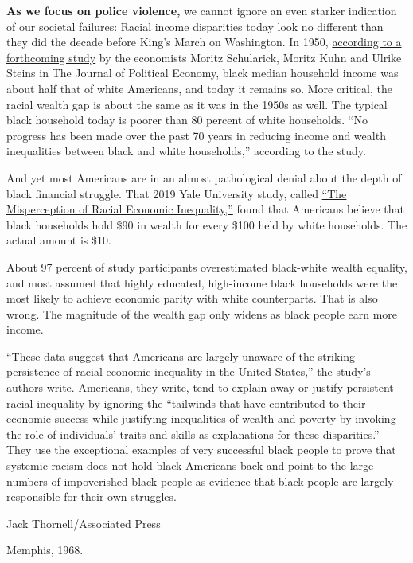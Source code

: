 \textbf{As we focus on police violence,} we cannot ignore an even
starker indication of our societal failures: Racial income disparities
today look no different than they did the decade before King's March on
Washington. In 1950,
\href{https://www.minneapolisfed.org/institute/working-papers-institute/iwp9.pdf}{according
to a forthcoming study} by the economists Moritz Schularick, Moritz Kuhn
and Ulrike Steins in The Journal of Political Economy, black median
household income was about half that of white Americans, and today it
remains so. More critical, the racial wealth gap is about the same as it
was in the 1950s as well. The typical black household today is poorer
than 80 percent of white households. ``No progress has been made over
the past 70 years in reducing income and wealth inequalities between
black and white households,'' according to the study.

And yet most Americans are in an almost pathological denial about the
depth of black financial struggle. That 2019 Yale University study,
called
\href{https://journals.sagepub.com/doi/full/10.1177/1745691619863049}{``The
Misperception of Racial Economic Inequality,''} found that Americans
believe that black households hold \$90 in wealth for every \$100 held
by white households. The actual amount is \$10.

About 97 percent of study participants overestimated black-white wealth
equality, and most assumed that highly educated, high-income black
households were the most likely to achieve economic parity with white
counterparts. That is also wrong. The magnitude of the wealth gap only
widens as black people earn more income.

``These data suggest that Americans are largely unaware of the striking
persistence of racial economic inequality in the United States,'' the
study's authors write. Americans, they write, tend to explain away or
justify persistent racial inequality by ignoring the ``tailwinds that
have contributed to their economic success while justifying inequalities
of wealth and poverty by invoking the role of individuals' traits and
skills as explanations for these disparities.'' They use the exceptional
examples of very successful black people to prove that systemic racism
does not hold black Americans back and point to the large numbers of
impoverished black people as evidence that black people are largely
responsible for their own struggles.

Jack Thornell/Associated Press

Memphis, 1968.

